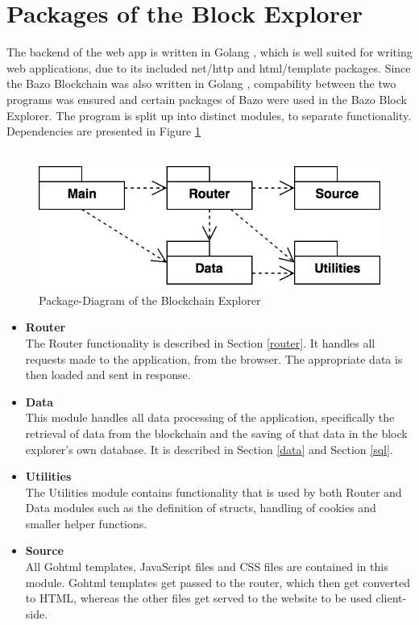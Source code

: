 \section{Packages of the Block Explorer}
The backend of the web app is written in Golang \cite{golang}, which is well suited for writing web applications, due to its included net/http \cite{httppackage} and html/template \cite{template} packages. Since the Bazo Blockchain was also written in Golang \cite{bazo}, compability between the two programs was ensured and certain packages of Bazo were used in the Bazo Block Explorer. The program is split up into distinct modules, to separate functionality. Dependencies are presented in Figure \ref{fig:packages} \\ \\

\begin{figure}[h]
  \includegraphics[scale=0.4]{packagesnew.png}
  \centering
  \caption{Package-Diagram of the Blockchain Explorer}
  \label{fig:packages}
\end{figure}

\begin{itemize}
\item \textbf{Router}\\
The Router functionality is described in Section \ref{router}. It handles all requests made to the application, from the browser. The appropriate data is then loaded and sent in response.
\item \textbf{Data}\\
This module handles all data processing of the application, specifically the retrieval of data from the blockchain and the saving of that data in the block explorer's own database. It is described in Section \ref{data} and Section \ref{sql}.
\item \textbf{Utilities}\\
The Utilities module contains functionality that is used by both Router and Data modules such as the definition of structs, handling of cookies and smaller helper functions.
\item \textbf{Source}\\
All Gohtml templates, JavaScript files and CSS files are contained in this module. Gohtml templates get passed to the router, which then get converted to HTML, whereas the other files get served to the website to be used client-side.
\end{itemize}

